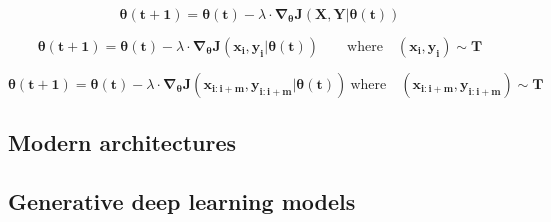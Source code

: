 \begin{equation}
	\label{eq:bgd}
	\mathbf{\theta(t+1)} = \mathbf{\theta(t)} - \lambda \cdot \mathbf{\nabla_\theta J(X, Y|\theta(t))}
\end{equation}
	
\begin{equation}
	\label{eq:sgd}
	\mathbf{\theta(t+1)} = \mathbf{\theta(t)} - \lambda \cdot \mathbf{\nabla_\theta J(x_i, y_i|\theta(t))} \quad \mathrm \quad \mathrm{where} \quad (\mathbf{x_i}, \mathbf{y_i}) \sim \mathbf{T}
\end{equation}

\begin{equation}
	\label{eq:mbsgd}
	\mathbf{\theta(t+1)} = \mathbf{\theta(t)} - \lambda \cdot \mathbf{\nabla_\theta J(x_{i:i+m}, y_{i:i+m}|\theta(t))} \  \mathrm{where} \quad  (\mathbf{x_{i:i+m}}, \mathbf{y_{i:i+m}}) \sim \mathbf{T}
\end{equation}


\subsection{Modern architectures}

\subsection{Generative deep learning models}
